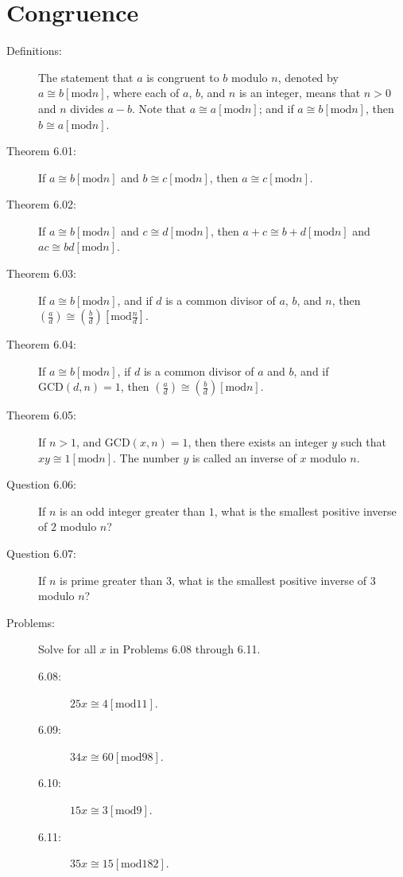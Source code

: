 \documentclass{article}
\begin{document}
\section{Congruence}

\begin{description}

  \item[Definitions:] The statement that $a$ is congruent to $b$ modulo $n$, denoted by $a \cong b [\text{mod} n]$, where each of $a$, $b$, and $n$ is an integer, means that $n>0$ and $n$ divides $a-b$. Note that $a \cong a [\text{mod} n]$; and if $a \cong b [\text{mod} n]$, then $b \cong a [\text{mod} n]$.

  \item[Theorem 6.01:] If $a \cong b [\text{mod} n]$ and $b \cong c [\text{mod} n]$, then $a \cong c [\text{mod} n]$.

  \item[Theorem 6.02:] If $a \cong b [\text{mod} n]$ and $c \cong d [\text{mod} n]$, then $a+c \cong b+d [\text{mod} n]$ and $ac \cong bd [\text{mod} n]$.

  \item[Theorem 6.03:] If $a \cong b [\text{mod} n]$, and if $d$ is a common divisor of $a$, $b$, and $n$, then $(\frac{a}{d}) \cong (\frac{b}{d}) [\text{mod} \frac{n}{d}]$.

  \item[Theorem 6.04:] If $a \cong b [\text{mod} n]$, if $d$ is a common divisor of $a$ and $b$, and if $\text{GCD}(d,n) = 1$, then $(\frac{a}{d}) \cong (\frac{b}{d}) [\text{mod} n]$.

  \item[Theorem 6.05:] If $n>1$, and $\text{GCD}(x,n) = 1$, then there exists an integer $y$ such that $xy \cong 1 [\text{mod} n]$. The number $y$ is called an inverse of $x$ modulo $n$.

  \item[Question 6.06:] If $n$ is an odd integer greater than $1$, what is the smallest positive inverse of $2$ modulo $n$?

  \item[Question 6.07:] If $n$ is prime greater than $3$, what is the smallest positive inverse of $3$ modulo $n$?

  \item[Problems:] Solve for all $x$ in Problems 6.08 through 6.11.
    \begin{description}
      \item[6.08:] $25x \cong 4 [\text{mod} 11]$.
      \item[6.09:] $34x \cong 60 [\text{mod} 98]$.
      \item[6.10:] $15x \cong 3 [\text{mod} 9]$.
      \item[6.11:] $35x \cong 15 [\text{mod} 182]$.
    \end{description}


\end{description}
\end{document}
